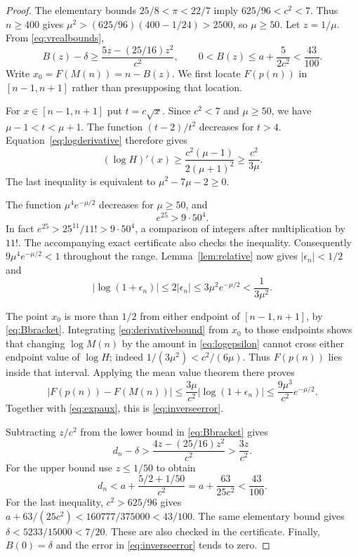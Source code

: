 \documentclass[11pt]{article}
\numberwithin{equation}{section}
\theoremstyle{definition}
\theoremstyle{remark}
\begin{document}
\begin{proof}
The elementary bounds $25/8<\pi<22/7$ imply $625/96<c^2<7$.
Thus $n\ge400$ gives
$\mu^2>(625/96)(400-1/24)>2500$, so $\mu\ge50$.
Let $z=1/\mu$. From \eqref{eq:vrealbounds},
\begin{equation}\label{eq:Bbracket}
 B(z)-\delta\ge\frac{5z-(25/16)z^2}{c^2},\qquad
 0<B(z)\le a+\frac{5}{2c^2}<\frac{43}{100}.
\end{equation}
Write $x_0=F(M(n))=n-B(z)$. We first locate $F(p(n))$ in
$[n-1,n+1]$ rather than presupposing that location.

For $x\in[n-1,n+1]$ put $t=c\sqrt x$. Since $c^2<7$ and $\mu\ge50$,
we have $\mu-1<t<\mu+1$. The function $(t-2)/t^2$ decreases for
$t>4$. Equation~\eqref{eq:logderivative} therefore gives
\begin{equation}\label{eq:derivativebound}
 (\log H)'(x)\ge\frac{c^2(\mu-1)}{2(\mu+1)^2}
 \ge\frac{c^2}{3\mu}.
\end{equation}
The last inequality is equivalent to
$\mu^2-7\mu-2\ge0$.

The function $\mu^4e^{-\mu/2}$ decreases for $\mu\ge50$, and
\begin{equation}\label{eq:expaux}
 e^{25}>9\cdot50^4.
\end{equation}
In fact $e^{25}>25^{11}/11!>9\cdot50^4$, a comparison of integers
after multiplication by $11!$. The accompanying exact certificate also
checks the inequality. Consequently $9\mu^4e^{-\mu/2}<1$ throughout the range.
Lemma~\ref{lem:relative} now gives $|\epsilon_n|<1/2$ and
\begin{equation}\label{eq:logepsilon}
 |\log(1+\epsilon_n)|\le2|\epsilon_n|
 \le3\mu^2e^{-\mu/2}<\frac1{3\mu^2}.
\end{equation}

The point $x_0$ is more than $1/2$ from either endpoint of $[n-1,n+1]$,
by \eqref{eq:Bbracket}. Integrating \eqref{eq:derivativebound} from
$x_0$ to those endpoints shows that changing $\log M(n)$ by the amount
in \eqref{eq:logepsilon} cannot cross either endpoint value of $\log H$;
indeed $1/(3\mu^2)<c^2/(6\mu)$. Thus $F(p(n))$ lies inside that
interval. Applying the mean value theorem there proves
\[
 |F(p(n))-F(M(n))|
 \le\frac{3\mu}{c^2}|\log(1+\epsilon_n)|
 \le\frac{9\mu^3}{c^2}e^{-\mu/2}.
\]
Together with \eqref{eq:expaux}, this is \eqref{eq:inverseerror}.

Subtracting $z/c^2$ from the lower bound in \eqref{eq:Bbracket} gives
\[
 d_n-\delta>\frac{4z-(25/16)z^2}{c^2}
 >\frac{3z}{c^2}.
\]
For the upper bound use $z\le1/50$ to obtain
\[
 d_n<a+\frac{5/2+1/50}{c^2}
 =a+\frac{63}{25c^2}<\frac{43}{100}.
\]
For the last inequality, $c^2>625/96$ gives
$a+63/(25c^2)<160777/375000<43/100$.
The same elementary bound gives
$\delta<5233/15000<7/20$. These are also checked in the certificate. Finally, $B(0)=\delta$
and the error in \eqref{eq:inverseerror} tends to zero.
\end{proof}
\end{document}
